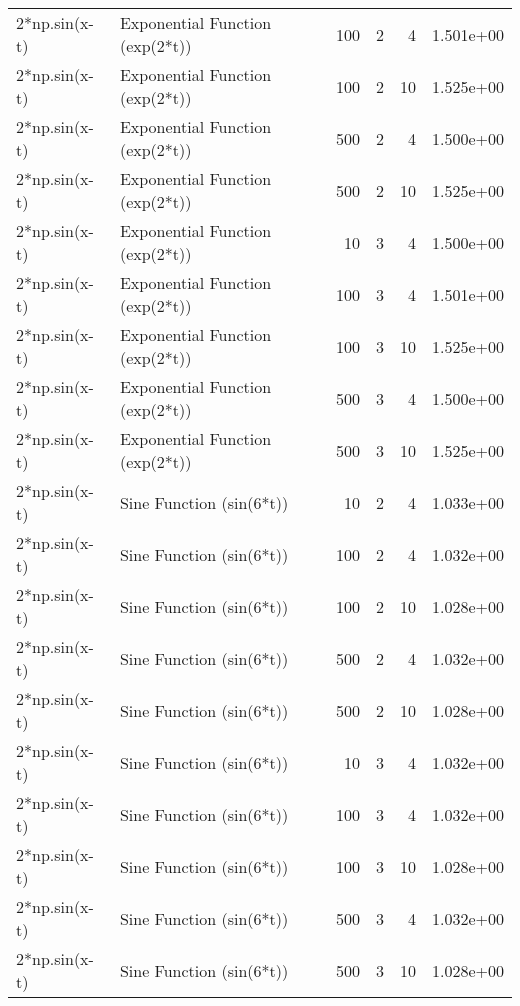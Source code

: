 \begin{tabular}{llrrrl}
2*np.sin(x-t) & Exponential Function (exp(2*t)) & 100 & 2 & 4 & 1.501e+00 \\
2*np.sin(x-t) & Exponential Function (exp(2*t)) & 100 & 2 & 10 & 1.525e+00 \\
2*np.sin(x-t) & Exponential Function (exp(2*t)) & 500 & 2 & 4 & 1.500e+00 \\
2*np.sin(x-t) & Exponential Function (exp(2*t)) & 500 & 2 & 10 & 1.525e+00 \\
2*np.sin(x-t) & Exponential Function (exp(2*t)) & 10 & 3 & 4 & 1.500e+00 \\
2*np.sin(x-t) & Exponential Function (exp(2*t)) & 100 & 3 & 4 & 1.501e+00 \\
2*np.sin(x-t) & Exponential Function (exp(2*t)) & 100 & 3 & 10 & 1.525e+00 \\
2*np.sin(x-t) & Exponential Function (exp(2*t)) & 500 & 3 & 4 & 1.500e+00 \\
2*np.sin(x-t) & Exponential Function (exp(2*t)) & 500 & 3 & 10 & 1.525e+00 \\
2*np.sin(x-t) & Sine Function (sin(6*t)) & 10 & 2 & 4 & 1.033e+00 \\
2*np.sin(x-t) & Sine Function (sin(6*t)) & 100 & 2 & 4 & 1.032e+00 \\
2*np.sin(x-t) & Sine Function (sin(6*t)) & 100 & 2 & 10 & 1.028e+00 \\
2*np.sin(x-t) & Sine Function (sin(6*t)) & 500 & 2 & 4 & 1.032e+00 \\
2*np.sin(x-t) & Sine Function (sin(6*t)) & 500 & 2 & 10 & 1.028e+00 \\
2*np.sin(x-t) & Sine Function (sin(6*t)) & 10 & 3 & 4 & 1.032e+00 \\
2*np.sin(x-t) & Sine Function (sin(6*t)) & 100 & 3 & 4 & 1.032e+00 \\
2*np.sin(x-t) & Sine Function (sin(6*t)) & 100 & 3 & 10 & 1.028e+00 \\
2*np.sin(x-t) & Sine Function (sin(6*t)) & 500 & 3 & 4 & 1.032e+00 \\
2*np.sin(x-t) & Sine Function (sin(6*t)) & 500 & 3 & 10 & 1.028e+00 \\
\bottomrule
\end{tabular}
